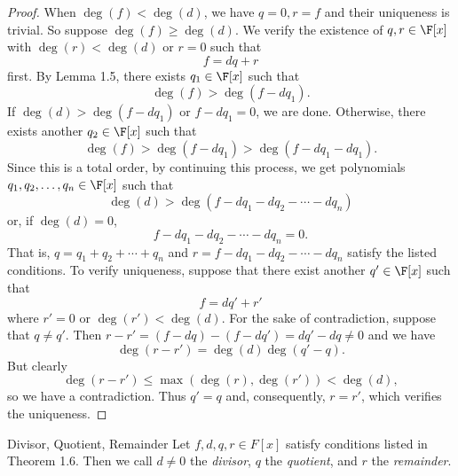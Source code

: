\documentclass[math_245.tex]{subfiles}
\begin{document}
    \begin{proof}
        When $\deg(f) < \deg(d)$, we have $q=0, r=f$ and their uniqueness is trivial. So suppose $\deg(f)\geq\deg(d)$. We verify the existence of $q, r\in \F[x]$ with $\deg(r)<\deg(d)$ or $r=0$ such that
        \begin{equation*}
            f = dq+r
        \end{equation*}
        first. By Lemma 1.5, there exists $q_1\in \F[x]$ such that
        \begin{equation*}
            \deg(f) > \deg(f-dq_1).
        \end{equation*}
        If $\deg(d) > \deg(f-dq_1)$ or $f-dq_1 = 0$, we are done. Otherwise, there exists another $q_2\in \F[x]$ such that
        \begin{equation*}
            \deg(f) > \deg(f-dq_1) > \deg(f-dq_1-dq_1).
        \end{equation*}
        Since this is a total order, by continuing this process, we get polynomials $q_1, q_2, \ldots, q_n\in \F[x]$ such that
        \begin{equation*}
            \deg(d) > \deg(f-dq_1-dq_2-\cdots-dq_n)
        \end{equation*}
        or, if $\deg(d) = 0$,
        \begin{equation*}
            f - dq_1 - dq_2 - \cdots - dq_n = 0.
        \end{equation*}
        That is, $q = q_1+q_2+\cdots+q_n$ and $r = f-dq_1-dq_2-\cdots-dq_n$ satisfy the listed conditions. To verify uniqueness, suppose that there exist another $q'\in \F[x]$ such that
        \begin{equation*}
            f = dq'+r'
        \end{equation*}
        where $r' = 0$ or $\deg(r')<\deg(d)$. For the sake of contradiction, suppose that $q\neq q'$. Then $r-r' = (f-dq)-(f-dq') = dq'-dq \neq 0$ and we have
        \begin{equation*}
            \deg(r-r') = \deg(d)\deg(q'-q).
        \end{equation*}
        But clearly
        \begin{equation*}
            \deg(r-r') \leq \max(\deg(r), \deg(r')) < \deg(d),
        \end{equation*}
        so we have a contradiction. Thus $q'=q$ and, consequently, $r=r'$, which verifies the uniqueness.
    \end{proof}

    \begin{definition}{Divisor, Quotient, Remainder}{}
        Let $f, d, q, r\in F[x]$ satisfy conditions listed in Theorem 1.6. Then we call $d\neq 0$ the \emph{divisor}, $q$ the \emph{quotient}, and $r$ the \emph{remainder}.
    \end{definition}
\end{document}
